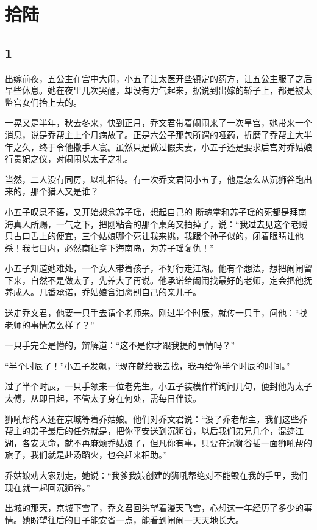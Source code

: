 \section{拾陆}

{\centering\subsection{1}}

出嫁前夜，五公主在宫中大闹，小五子让太医开些镇定的药方，让五公主服了之后早些休息。她在夜里几次哭醒，却没有力气起来，据说到出嫁的轿子上，都是被太监宫女们抬上去的。

一晃又是半年，秋去冬来，快到正月，乔文君带着闹闹来了一次皇宫，她带来一个消息，说是乔帮主上个月病故了。正是六公子那包所谓的哑药，折磨了乔帮主大半年之久，终于令他撒手人寰。虽然只是做过假夫妻，小五子还是要求后宫对乔姑娘行贵妃之仪，对闹闹以太子之礼。

当然，二人没有同房，以礼相待。有一次乔文君问小五子，他是怎么从沉狮谷跑出来的，那个猎人又是谁？

小五子叹息不语，又开始想念苏子瑶，想起自己的
断魂掌和苏子瑶的死都是拜南海真人所赐，一气之下，把刚粘合的那个桌角又拍掉了，说：“我过去见这个老贼只占口舌上的便宜，三个姑娘哪个死让我来挑，我跟个孙子似的，闭着眼睛让他杀！我七日内，必然南征拿下海南岛，为苏子瑶复仇！”

小五子知道她难处，一个女人带着孩子，不好行走江湖。他有个想法，想把闹闹留下来，自然不是做太子，先养大了再说。他承诺给闹闹找最好的老师，定会把他抚养成人。几番承诺，乔姑娘含泪离别自己的亲儿子。

送走乔文君，他要一只手去请个老师来。刚过半个时辰，就传一只手，问他：“找老师的事情怎么样了？”

一只手完全是懵的，辩解道：“这不是你才跟我提的事情吗？”

“半个时辰了！”小五子发飙，“现在就给我去找，我再给你半个时辰的时间。”

过了半个时辰，一只手领来一位老先生。小五子装模作样询问几句，便封他为太子太傅，从即日起，不管太子身在何处，需每日伴读。

狮吼帮的人还在京城等着乔姑娘。他们对乔文君说：“没了乔老帮主，我们这些乔帮主的弟子最后的任务就是，把你平安送到沉狮谷，以后我们弟兄几个，混迹江湖，各安天命，就不再麻烦乔姑娘了，但凡你有事，只要在沉狮谷插一面狮吼帮的旗子，我们就是赴汤蹈火，也会赶来相助。”

乔姑娘劝大家别走，她说：“我爹我娘创建的狮吼帮绝对不能毁在我的手里，我们现在就一起回沉狮谷。”

出城的那天，京城下雪了，乔文君回头望着漫天飞雪，心想这一年经历了多少的事情。她盼望往后的日子能安省一点，能看到闹闹一天天地长大。
\newline

